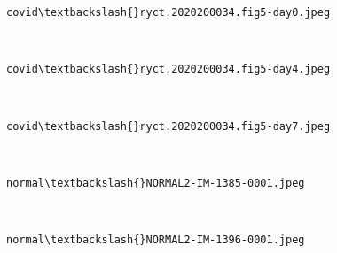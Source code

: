 \documentclass[11pt]{article}
\begin{document}
    \begin{Verbatim}[commandchars=\\\{\}]
covid\textbackslash{}ryct.2020200034.fig5-day0.jpeg
    \end{Verbatim}

    \begin{center}
    \end{center}
    { \hspace*{\fill} \\}
    
    \begin{Verbatim}[commandchars=\\\{\}]
covid\textbackslash{}ryct.2020200034.fig5-day4.jpeg
    \end{Verbatim}

    \begin{center}
    \end{center}
    { \hspace*{\fill} \\}
    
    \begin{Verbatim}[commandchars=\\\{\}]
covid\textbackslash{}ryct.2020200034.fig5-day7.jpeg
    \end{Verbatim}

    \begin{center}
    \end{center}
    { \hspace*{\fill} \\}
    
    \begin{Verbatim}[commandchars=\\\{\}]
normal\textbackslash{}NORMAL2-IM-1385-0001.jpeg
    \end{Verbatim}

    \begin{center}
    \end{center}
    { \hspace*{\fill} \\}
    
    \begin{Verbatim}[commandchars=\\\{\}]
normal\textbackslash{}NORMAL2-IM-1396-0001.jpeg
    \end{Verbatim}
\end{document}
